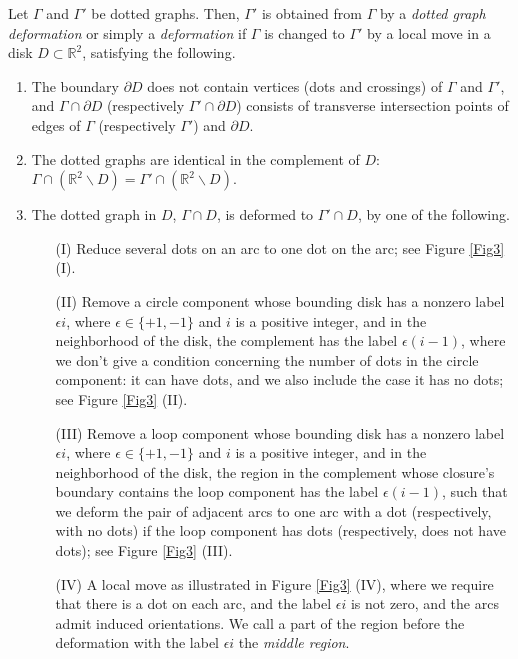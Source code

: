 \documentclass[a4paper,11pt]{amsart}
\numberwithin{equation}{section}
\begin{document}
\begin{definition}\label{def3-2}
Let $\Gamma$ and $\Gamma'$ be dotted graphs. 
Then, 
$\Gamma'$ is obtained from $\Gamma$ by 
a {\it dotted graph deformation} or simply a  {\it deformation} if $\Gamma$ is changed to $\Gamma'$ by a local move in a disk $D\subset \mathbb{R}^2$, satisfying the following. 

\begin{enumerate}
\item
The boundary $\partial D$ does not contain vertices (dots and crossings) of $\Gamma$ and $\Gamma'$, and $\Gamma \cap \partial D$ (respectively $\Gamma' \cap \partial D$) consists of transverse intersection points of edges of $\Gamma$ (respectively $\Gamma'$) and $\partial D$. 


\item
The dotted graphs are identical in the complement of $D$: 
$\Gamma \cap (\mathbb{R}^2\backslash D)=\Gamma' \cap (\mathbb{R}^2\backslash D)$. 

\item
The dotted graph in $D$, $\Gamma \cap D$, is deformed to $\Gamma' \cap D$, by one of the following.
 
\begin{enumerate}

\item[(I)]
Reduce several dots on an arc to one dot on the arc; see Figure \ref{Fig3} (I).

\item[(II)]
Remove a circle component whose bounding disk has a nonzero label $\epsilon i$, where $\epsilon \in \{+1, -1\}$ and $i$ is a positive integer, and in the neighborhood of the disk, the complement has the  label $\epsilon (i-1)$, where we don't give a condition concerning the number of dots in the circle component: it can have dots, and we also include the case it has no dots; see Figure \ref{Fig3} (II).  

\item[(III)]
Remove a loop component whose bounding disk has a nonzero label  $\epsilon i$, where $\epsilon \in \{+1, -1\}$ and $i$ is a positive integer, and in the neighborhood of the disk, the region in the complement whose closure's boundary contains the loop component has the label $\epsilon (i-1)$, such that we deform the pair of adjacent arcs to one arc with a dot  (respectively, with no dots) if the loop component has dots (respectively, does not have dots); see Figure \ref{Fig3} (III). 

\item[(IV)]
A local move as illustrated in Figure \ref{Fig3} (IV), where we require that there is a dot on each arc, and the label $\epsilon i$ is not zero, and the arcs admit induced orientations. 
We call a part of the region before the deformation with the label $\epsilon i$ the {\it middle region}. 


\end{enumerate}
\end{enumerate}
\end{definition}
\end{document}
